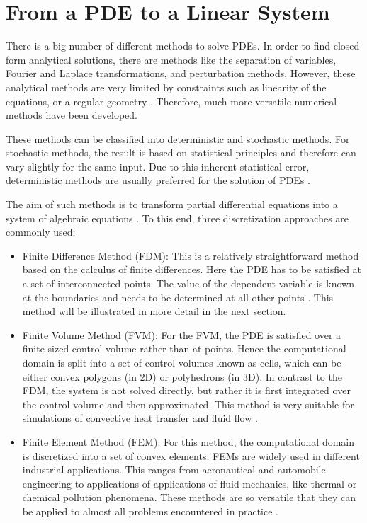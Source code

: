 \section{From a PDE to a Linear System}
There is a big number of different methods to solve PDEs. In order to find closed form analytical solutions, there are methods like the separation of variables, Fourier and Laplace transformations, and perturbation methods. However, these analytical methods are very limited by constraints such as linearity of the equations, or a regular geometry \cite{mazumder2015numerical}. Therefore, much more versatile numerical methods have been developed. 

These methods can be classified into deterministic and stochastic methods. For stochastic methods, the result is based on statistical principles and therefore can vary slightly for the same input. Due  to this inherent statistical error, deterministic methods are usually preferred for the solution of PDEs \cite{mazumder2015numerical}. 


The aim of such methods is to transform partial differential equations into a system of algebraic equations \cite{jasak1996error}. To this end, three discretization approaches are commonly used:
\begin{itemize}
\item Finite Difference Method (FDM): This is a relatively straightforward method based on the calculus of finite differences. Here the PDE has to be satisfied at a set of interconnected points. The value of the dependent variable is known at the boundaries and needs to be determined at all other points \cite{mazumder2015numerical}. This method will be illustrated in more detail in the next section. 
\item Finite Volume Method (FVM): For the FVM, the PDE is satisfied over a finite-sized control volume rather than at points. Hence the computational domain is split into a set of control volumes known as cells, which can be either convex polygons (in 2D) or polyhedrons (in 3D). In contrast to the FDM, the system is not solved directly, but rather it is first integrated over the control volume and then approximated.  This method is very suitable for simulations of convective heat transfer and fluid flow \cite{raithby1990finite,mazumder2015numerical}.

\item Finite Element Method (FEM): For this method, the computational domain is discretized into a set of convex elements. FEMs are widely used in different industrial applications. This ranges from aeronautical and automobile engineering to applications of applications of fluid mechanics, like thermal or chemical pollution phenomena. These methods are so versatile that they can be applied to almost all problems encountered in practice \cite{dhatt_fem}.
\end{itemize}

